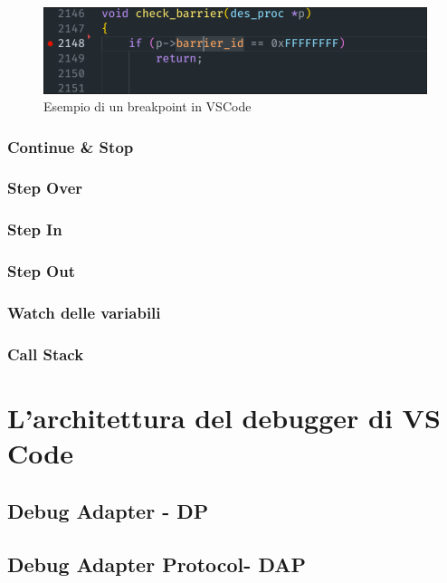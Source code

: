 \begin{figure}[h]
    \centering
    \includegraphics[width=0.7\columnwidth]{images/breakpoint_vscode.png}
    \caption{Esempio di un breakpoint in VSCode}
    \label{fig:breakpoint}
\end{figure}

\subsubsection{Continue & Stop}

\subsubsection{Step Over}

\subsubsection{Step In}

\subsubsection{Step Out}

\subsubsection{Watch delle variabili}

\subsubsection{Call Stack}

\section{L'architettura del debugger di VS Code}

\subsection{Debug Adapter - DP}

\subsection{Debug Adapter Protocol- DAP}

